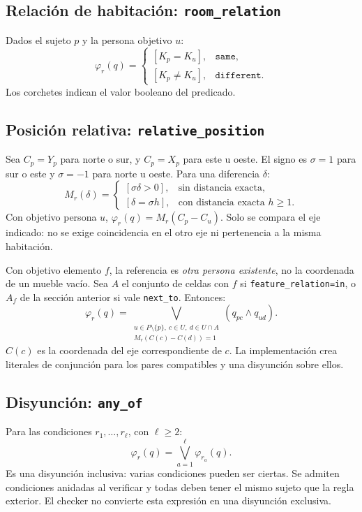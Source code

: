 \documentclass[11pt,a4paper]{article}
\begin{document}
\subsection{Relaci\'on de habitaci\'on: \texttt{room\_relation}}

Dados el sujeto $p$ y la persona objetivo $u$:
\[
 \varphi_r(q)=
 \begin{cases}
  [K_p=K_u],&\texttt{same},\\
  [K_p\neq K_u],&\texttt{different}.
 \end{cases}
\]
Los corchetes indican el valor booleano del predicado.

\subsection{Posici\'on relativa: \texttt{relative\_position}}

Sea $C_p=Y_p$ para norte o sur, y $C_p=X_p$ para este u oeste.
El signo es $\sigma=1$ para sur o este y $\sigma=-1$ para norte
u oeste. Para una diferencia $\delta$:
\[
 M_r(\delta)=
 \begin{cases}
  [\sigma\delta>0],&\text{sin distancia exacta},\\
  [\delta=\sigma h],&\text{con distancia exacta }h\geq1.
 \end{cases}
\]
Con objetivo persona $u$, $\varphi_r(q)=M_r(C_p-C_u)$.
Solo se compara el eje indicado: no se exige coincidencia en el
otro eje ni pertenencia a la misma habitaci\'on.

Con objetivo elemento $f$, la referencia es \emph{otra persona
existente}, no la coordenada de un mueble vac\'io. Sea $A$ el conjunto
de celdas con $f$ si \texttt{feature\_relation=in}, o $A_f$ de la
secci\'on anterior si vale \texttt{next\_to}. Entonces:
\[
 \varphi_r(q)=
 \bigvee_{\substack{u\in P\setminus\{p\},\ c\in U,\ d\in U\cap A\\
 M_r(C(c)-C(d))=1}}
       (q_{pc}\land q_{ud}).
\]
$C(c)$ es la coordenada del eje correspondiente de $c$.
La implementaci\'on crea literales de conjunci\'on para los pares
compatibles y una disyunci\'on sobre ellos.

\subsection{Disyunci\'on: \texttt{any\_of}}

Para las condiciones $r_1,\ldots,r_\ell$, con $\ell\geq2$:
\[
 \varphi_r(q)=\bigvee_{a=1}^{\ell}\varphi_{r_a}(q).
\]
Es una disyunci\'on inclusiva: varias condiciones pueden ser ciertas.
Se admiten condiciones anidadas al verificar y todas deben tener el
mismo sujeto que la regla exterior. El checker no convierte esta
expresi\'on en una disyunci\'on exclusiva.
\end{document}

